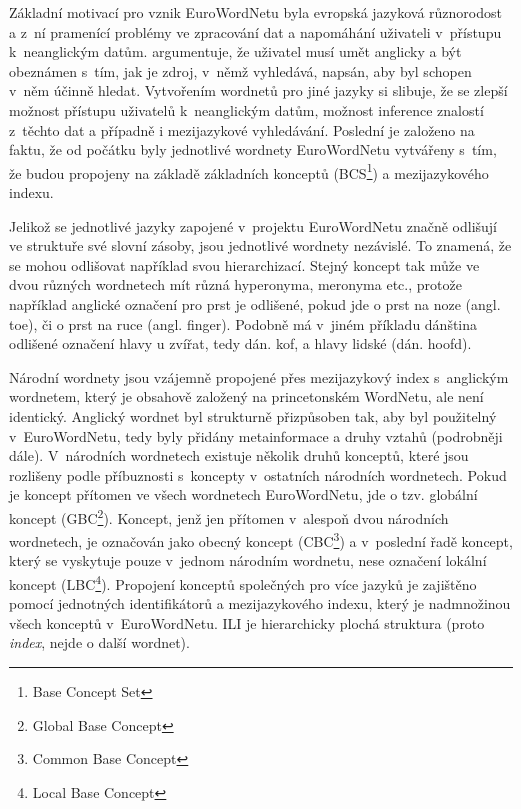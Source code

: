 \documentclass[a4paper,11pt,openany,twoside]{book}
\newcommand\ex{\textsf}
\begin{document}
				Základní motivací pro vznik EuroWordNetu byla evropská jazyková různorodost a z~ní pramenící problémy ve zpracování dat a napomáhání uživateli v~přístupu k~neanglickým datům. \textcite{vossen1997eurowordnet} argumentuje, že uživatel musí umět anglicky a být obeznámen s~tím, jak je zdroj, v~němž vyhledává, napsán, aby byl schopen v~něm účinně hledat. Vytvořením wordnetů pro jiné jazyky si slibuje, že se zlepší možnost přístupu uživatelů k~neanglickým datům, možnost inference znalostí z~těchto dat a případně i mezijazykové vyhledávání. Poslední je založeno na faktu, že od počátku byly jednotlivé wordnety EuroWordNetu vytvářeny s~tím, že budou propojeny na základě základních konceptů (BCS\footnote{Base Concept Set}) a mezijazykového indexu.

				Jelikož se jednotlivé jazyky zapojené v~projektu EuroWordNetu značně odlišují ve struktuře své slovní zásoby, jsou jednotlivé wordnety nezávislé. To znamená, že se mohou odlišovat například svou hierarchizací. Stejný koncept tak může ve dvou různých wordnetech mít různá hyperonyma, meronyma etc., protože například anglické označení pro \ex{prst} je odlišené, pokud jde o \ex{prst na noze} (angl. \ex{toe}), či o \ex{prst na ruce} (angl. \ex{finger}). Podobně má v~jiném příkladu dánština odlišené označení \ex{hlavy u zvířat}, tedy dán. \ex{kof}, a \ex{hlavy lidské} (dán. \ex{hoofd}). \parencite{vossen1997eurowordnet}

				Národní wordnety jsou vzájemně propojené přes mezijazykový index s~anglickým wordnetem, který je obsahově založený na princetonském WordNetu, ale není identický. Anglický wordnet byl strukturně přizpůsoben tak, aby byl použitelný v~EuroWordNetu, tedy byly přidány metainformace a druhy vztahů (podrobněji dále). V~národních wordnetech existuje několik druhů konceptů, které jsou rozlišeny podle příbuznosti s~koncepty v~ostatních národních wordnetech. Pokud je koncept přítomen ve všech wordnetech EuroWordNetu, jde o tzv. globální koncept (GBC\footnote{Global Base Concept}). Koncept, jenž jen přítomen v~alespoň dvou národních wordnetech, je označován jako obecný koncept (CBC\footnote{Common Base Concept}) a v~poslední řadě koncept, který se vyskytuje pouze v~jednom národním wordnetu, nese označení lokální koncept (LBC\footnote{Local Base Concept}). \parencite{gwa2013baseconcepts} Propojení konceptů společných pro více jazyků je zajištěno pomocí jednotných identifikátorů a mezijazykového indexu, který je nadmnožinou všech konceptů v~EuroWordNetu. ILI je hierarchicky plochá struktura (proto \textit{index}, nejde o další  wordnet). \parencite{vossen1997eurowordnet}
\end{document}
